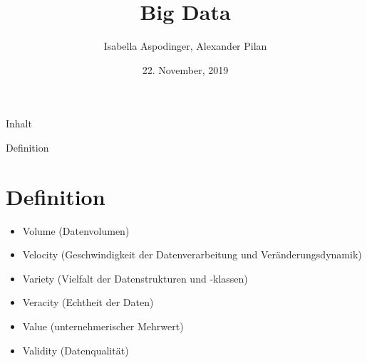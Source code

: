 \documentclass[11pt]{beamer}
\author{Isabella Aspodinger, Alexander Pilan}
\title{Big Data}
\institute{Paris Lodron Universität Salzburg}
\date{22. November, 2019}
\begin{document}
\begin{frame}
\titlepage
\end{frame}

\begin{frame}{Inhalt}
\tableofcontents
\end{frame}

\begin{frame}
\begin{figure}
	\end{figure}
\end{frame}

\begin{frame}{Definition}
\section{Definition}
\begin{itemize}
\item Volume (Datenvolumen)
\item Velocity (Geschwindigkeit der Datenverarbeitung und Veränderungsdynamik)
\item Variety (Vielfalt der Datenstrukturen und -klassen)
\item Veracity (Echtheit der Daten)
\item Value (unternehmerischer Mehrwert)
\item Validity (Datenqualität)
\end{itemize}
\end{frame}
\end{document}
